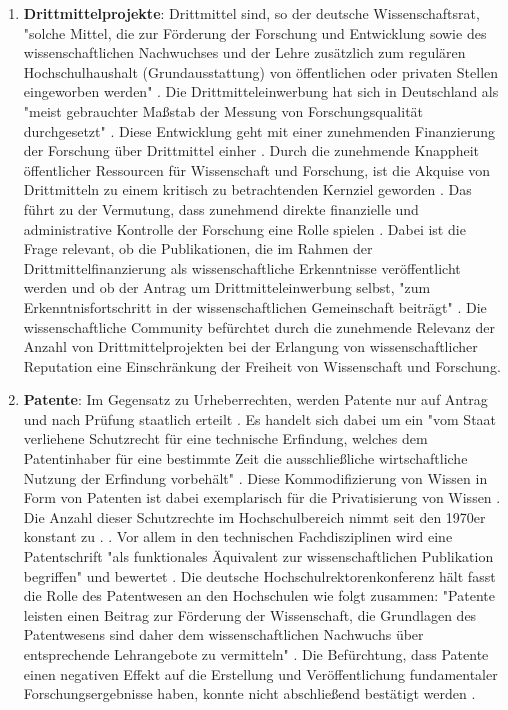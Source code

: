 \begin{enumerate}
\item \textbf{Drittmittelprojekte}: Drittmittel sind, so der deutsche Wissenschaftsrat, "solche Mittel, die zur Förderung der Forschung und Entwicklung sowie des wissenschaftlichen Nachwuchses und der Lehre zusätzlich zum regulären Hochschulhaushalt (Grundausstattung) von öffentlichen oder privaten Stellen eingeworben werden" \cite{Wissenschaftsrat_2014}. Die Drittmitteleinwerbung hat sich in Deutschland als "meist gebrauchter Maßstab der Messung von Forschungsqualität durchgesetzt" \cite{Muench_2006}. Diese Entwicklung geht mit einer zunehmenden Finanzierung der Forschung über Drittmittel einher \cite{Neidhardt_2010} \cite{Jansen_2007} \cite{Simon_2010}. Durch die zunehmende Knappheit öffentlicher Ressourcen für Wissenschaft und Forschung, ist die Akquise von Drittmitteln zu einem kritisch zu betrachtenden Kernziel geworden \cite{Jansen_2007}. Das führt zu der Vermutung, dass zunehmend direkte finanzielle und administrative Kontrolle der Forschung eine Rolle spielen \cite{Barloesius_2008}. Dabei ist die Frage relevant, ob die Publikationen, die im Rahmen der Drittmittelfinanzierung als wissenschaftliche Erkenntnisse veröffentlicht werden und ob der Antrag um Drittmitteleinwerbung selbst, "zum Erkenntnisfortschritt in der wissenschaftlichen Gemeinschaft beiträgt" \cite{Muench_2006}. Die wissenschaftliche Community befürchtet durch die zunehmende Relevanz der Anzahl von Drittmittelprojekten bei der Erlangung von wissenschaftlicher Reputation eine Einschränkung der Freiheit von Wissenschaft und Forschung.
\item \textbf{Patente}: Im Gegensatz zu Urheberrechten, werden Patente nur auf Antrag und nach Prüfung staatlich erteilt \cite[:152]{Troy_2012}. Es handelt sich dabei um ein "vom Staat verliehene Schutzrecht für eine technische Erfindung, welches dem Patentinhaber für eine bestimmte Zeit die ausschließliche wirtschaftliche Nutzung der Erfindung vorbehält" \cite{Greif_2003}. Diese Kommodifizierung von Wissen in Form von Patenten ist dabei exemplarisch für die Privatisierung von Wissen \cite[:152]{Troy_2012}. Die Anzahl dieser Schutzrechte im Hochschulbereich nimmt seit den 1970er konstant zu \cite[:168]{Troy_2012}. \cite{Schmoch_2003} \cite{Fabrizio_2008}. Vor allem in den technischen Fachdisziplinen wird eine Patentschrift "als funktionales Äquivalent zur wissenschaftlichen Publikation begriffen" und bewertet \cite{Mersch_2014}. Die deutsche Hochschulrektorenkonferenz hält fasst die Rolle des Patentwesen an den Hochschulen wie folgt zusammen: "Patente leisten einen Beitrag zur Förderung der Wissenschaft, die Grundlagen des Patentwesens sind daher dem wissenschaftlichen Nachwuchs über entsprechende Lehrangebote zu vermitteln" \cite{Greif_2003}. Die Befürchtung, dass Patente einen negativen Effekt auf die Erstellung und Veröffentlichung fundamentaler Forschungsergebnisse haben, konnte nicht abschließend bestätigt werden \cite{Fabrizio_2008}.

\end{enumerate}
